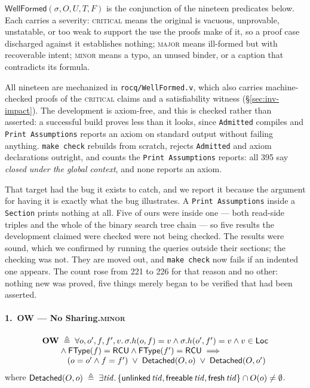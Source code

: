 $\textsf{WellFormed}(\sigma,O,U,T,F)$ is the conjunction of the nineteen
predicates below.  Each carries a severity: \textsc{critical} means the original
is vacuous, unprovable, unstatable, or too weak to support the use the proofs
make of it, so a proof case discharged against it establishes nothing;
\textsc{major} means ill-formed but with recoverable intent; \textsc{minor}
means a typo, an unused binder, or a caption that contradicts its formula.

All nineteen are mechanized in \texttt{rocq/WellFormed.v}, which also carries
machine-checked proofs of the \textsc{critical} claims and a satisfiability
witness (\S\ref{sec:inv-impact}).  The development is axiom-free, and this is
checked rather than asserted: a successful build proves less than it looks,
since \texttt{Admitted} compiles and \texttt{Print Assumptions} reports an axiom
on standard output without failing anything.  \texttt{make check} rebuilds from
scratch, rejects \texttt{Admitted} and axiom declarations outright, and counts
the \texttt{Print Assumptions} reports: all 395 say \emph{closed under the
global context}, and none reports an axiom.

That target had the bug it exists to catch, and we report it because the
argument for having it is exactly what the bug illustrates.  A
\texttt{Print Assumptions} inside a \texttt{Section} prints nothing at all.
Five of ours were inside one --- both read-side triples and the whole of the
binary search tree chain --- so five results the development claimed were
checked were not being checked.  The results were sound, which we confirmed by
running the queries outside their sections; the checking was not.  They are
moved out, and \texttt{make check} now fails if an indented one appears.  The
count rose from 221 to 226 for that reason and no other: nothing new was proved,
five things merely began to be verified that had been asserted.

\paragraph{1.\ OW --- No Sharing.\hfill\textsc{minor}}
\[
\begin{array}{l}
\textbf{OW} \;\triangleq\; \forall o,o',f,f',v \ldotp
  \sigma.h(o,f) = v \land \sigma.h(o',f') = v \land v\in\textsf{Loc} \\
\qquad {} \land \textsf{FType}(f) = \textsf{RCU} \land \textsf{FType}(f') = \textsf{RCU} \implies \\
\qquad\quad (o = o' \land f = f')
  \;\lor\; \textsf{Detached}(O,o) \;\lor\; \textsf{Detached}(O,o')
\end{array}
\]
where $\textsf{Detached}(O,o) \;\triangleq\; \exists \mathit{tid} \ldotp
\{\textsf{unlinked}\,\mathit{tid}, \textsf{freeable}\,\mathit{tid}, \textsf{fresh}\,\mathit{tid}\} \cap O(o) \neq \emptyset$.

